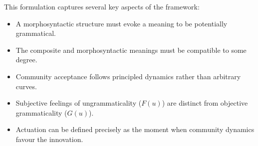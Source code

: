 This formulation captures several key aspects of the framework:

\begin{itemize}
    \item A morphosyntactic structure must evoke a meaning to be potentially grammatical.
    \item The composite and morphosyntactic meanings must be compatible to some degree.
    \item Community acceptance follows principled dynamics rather than arbitrary curves.
    \item Subjective feelings of ungrammaticality ($F(u)$) are distinct from objective grammaticality ($G(u)$).
    \item Actuation can be defined precisely as the moment when community dynamics favour the innovation.
\end{itemize}